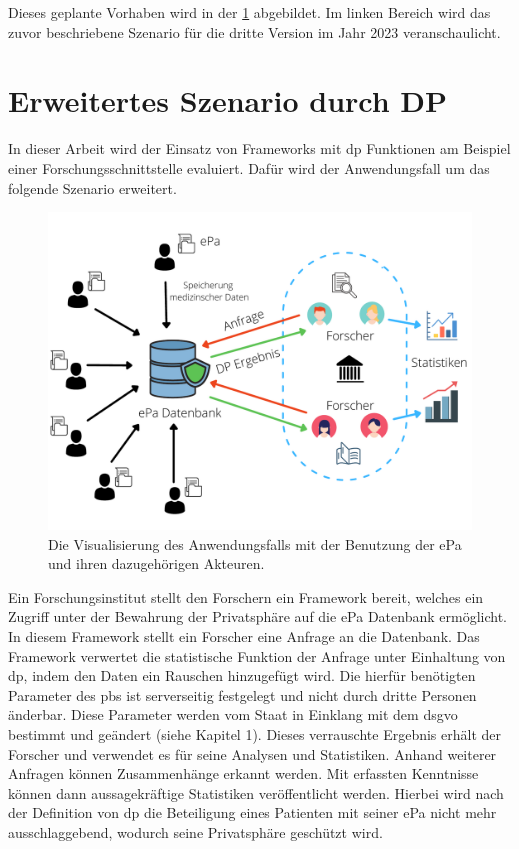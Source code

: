 Dieses geplante Vorhaben wird in der \cref{fig:useCase} abgebildet. Im linken Bereich wird das zuvor beschriebene Szenario für die dritte Version im Jahr 2023 veranschaulicht.

\section{Erweitertes Szenario durch DP}
In dieser Arbeit wird der Einsatz von Frameworks mit \gls{dp} Funktionen am Beispiel einer Forschungsschnittstelle
evaluiert. Dafür wird der Anwendungsfall um das folgende Szenario erweitert.
\begin{figure}[!htbp]
	\centering
	\includegraphics[scale=0.4]{./images/use_case.pdf}
	\caption{Die Visualisierung des Anwendungsfalls mit der Benutzung der \gls{ePa} und ihren dazugehörigen Akteuren.}
	\label{fig:useCase}
\end{figure}

Ein Forschungsinstitut stellt den Forschern ein Framework bereit, welches ein Zugriff unter der Bewahrung der Privatsphäre auf die \gls{ePa} Datenbank ermöglicht. In diesem Framework stellt ein Forscher eine Anfrage an die Datenbank. Das Framework verwertet die statistische Funktion der Anfrage unter Einhaltung von \gls{dp}, indem den Daten ein Rauschen hinzugefügt wird. Die hierfür benötigten Parameter des \gls{pb}s ist serverseitig festgelegt und nicht durch dritte Personen änderbar. Diese Parameter werden vom Staat in Einklang mit dem \gls{dsgvo} bestimmt und geändert (siehe Kapitel 1). Dieses verrauschte Ergebnis erhält der Forscher und verwendet es für seine Analysen und Statistiken. Anhand weiterer Anfragen können Zusammenhänge erkannt werden. Mit erfassten Kenntnisse können dann aussagekräftige Statistiken veröffentlicht werden. Hierbei wird nach der Definition von \gls{dp} die Beteiligung eines Patienten mit seiner \gls{ePa} nicht mehr ausschlaggebend, wodurch seine Privatsphäre geschützt wird.  

